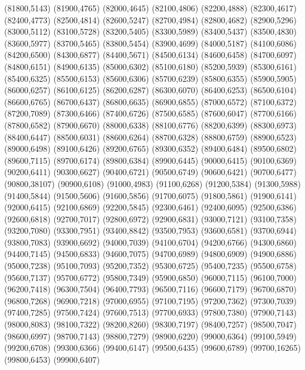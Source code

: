 (81800,5143)
(81900,4765)
(82000,4645)
(82100,4806)
(82200,4888)
(82300,4617)
(82400,4773)
(82500,4814)
(82600,5247)
(82700,4984)
(82800,4682)
(82900,5296)
(83000,5112)
(83100,5728)
(83200,5405)
(83300,5989)
(83400,5437)
(83500,4830)
(83600,5977)
(83700,5465)
(83800,5454)
(83900,4699)
(84000,5187)
(84100,6086)
(84200,6500)
(84300,6877)
(84400,5671)
(84500,6134)
(84600,6458)
(84700,6097)
(84800,6151)
(84900,6135)
(85000,6302)
(85100,6180)
(85200,5939)
(85300,6161)
(85400,6325)
(85500,6153)
(85600,6306)
(85700,6239)
(85800,6355)
(85900,5905)
(86000,6257)
(86100,6125)
(86200,6287)
(86300,6070)
(86400,6253)
(86500,6104)
(86600,6765)
(86700,6437)
(86800,6635)
(86900,6855)
(87000,6572)
(87100,6372)
(87200,7089)
(87300,6466)
(87400,6726)
(87500,6585)
(87600,6047)
(87700,6166)
(87800,6582)
(87900,6670)
(88000,6338)
(88100,6776)
(88200,6399)
(88300,6973)
(88400,6447)
(88500,6031)
(88600,6264)
(88700,6328)
(88800,6759)
(88900,6523)
(89000,6498)
(89100,6426)
(89200,6765)
(89300,6352)
(89400,6484)
(89500,6802)
(89600,7115)
(89700,6174)
(89800,6384)
(89900,6445)
(90000,6415)
(90100,6369)
(90200,6411)
(90300,6627)
(90400,6721)
(90500,6749)
(90600,6421)
(90700,6477)
(90800,38107)
(90900,6108)
(91000,4983)
(91100,6268)
(91200,5384)
(91300,5988)
(91400,5844)
(91500,5606)
(91600,5856)
(91700,6075)
(91800,5861)
(91900,6141)
(92000,6415)
(92100,6869)
(92200,5845)
(92300,6461)
(92400,6095)
(92500,6386)
(92600,6818)
(92700,7017)
(92800,6972)
(92900,6831)
(93000,7121)
(93100,7358)
(93200,7080)
(93300,7951)
(93400,8842)
(93500,7953)
(93600,6581)
(93700,6944)
(93800,7083)
(93900,6692)
(94000,7039)
(94100,6704)
(94200,6766)
(94300,6860)
(94400,7145)
(94500,6833)
(94600,7075)
(94700,6989)
(94800,6909)
(94900,6886)
(95000,7238)
(95100,7093)
(95200,7352)
(95300,6725)
(95400,7235)
(95500,6758)
(95600,7137)
(95700,6772)
(95800,7349)
(95900,6850)
(96000,7115)
(96100,7000)
(96200,7418)
(96300,7504)
(96400,7793)
(96500,7116)
(96600,7179)
(96700,6870)
(96800,7268)
(96900,7218)
(97000,6955)
(97100,7195)
(97200,7362)
(97300,7039)
(97400,7285)
(97500,7424)
(97600,7513)
(97700,6933)
(97800,7380)
(97900,7143)
(98000,8083)
(98100,7322)
(98200,8260)
(98300,7197)
(98400,7257)
(98500,7047)
(98600,6997)
(98700,7143)
(98800,7279)
(98900,6220)
(99000,6364)
(99100,5949)
(99200,6708)
(99300,6366)
(99400,6147)
(99500,6435)
(99600,6789)
(99700,16265)
(99800,6453)
(99900,6407)
